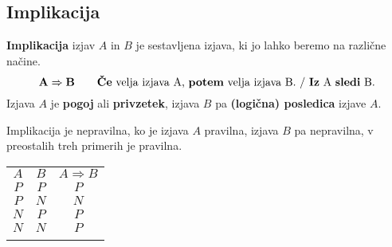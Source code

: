          
             \subsection{Implikacija}
                \textbf{Implikacija} izjav $A$ in $B$ je sestavljena izjava, ki jo lahko beremo
                na različne načine.
                $$ \mathbf{A\Rightarrow B} \quad \quad \textmd{\textbf{Če} velja izjava A, 
                \textbf{potem} velja izjava B. / \textbf{Iz} A \textbf{sledi} B.}$$
                Izjava $A$ je \textbf{pogoj} ali \textbf{privzetek}, izjava $B$ pa 
                \textbf{(logična) posledica} izjave $A$.
             
                      
                        Implikacija je nepravilna, ko je izjava $A$ pravilna, izjava $B$ pa 
                        nepravilna, v preostalih treh primerih je pravilna.
                     

                    \begin{table}[H]
                        \centering
                        \begin{tabular}{||c|c|c||} 
                        \hhline{|t:===:t|}
                        \rowcolor[rgb]{0.843,0.718,0.718} $A$ & $B$ & $A\Rightarrow B$  \\ 
                        \hhline{|:===:|}
                        $P$ & $P$ & $P$                         \\ 
                        \hline
                        $P$ & $N$ & $N$                         \\ 
                        \hline
                        $N$ & $P$ & $P$                         \\ 
                        \hline
                        $N$ & $N$ & $P$                         \\
                        \hhline{|b:===:b|}
                        \end{tabular}
                    \end{table}

         

